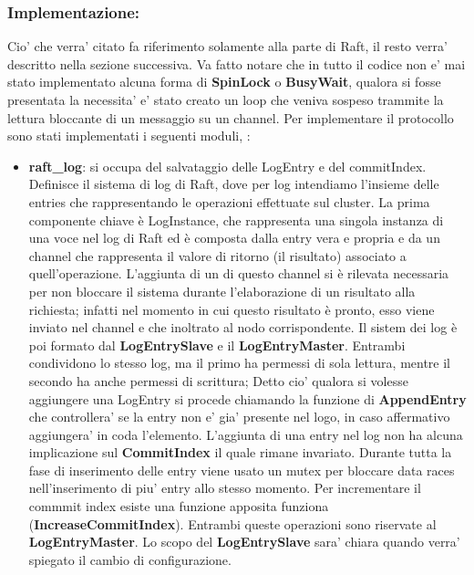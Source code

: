 \subsubsection{Implementazione:\\}
Cio' che verra' citato
fa riferimento solamente alla parte di Raft, il resto verra' descritto nella sezione successiva.
Va fatto notare che in tutto il codice non e' mai stato implementato alcuna forma di 
\textbf{SpinLock} o \textbf{BusyWait}, qualora si fosse presentata la necessita' e' stato
creato un loop che veniva sospeso trammite la lettura bloccante di un messaggio su un channel.
Per implementare il protocollo sono stati implementati i seguenti moduli, :
\begin{itemize}
    \item \textbf{raft\_log}: si occupa del salvataggio delle LogEntry e del commitIndex.
    Definisce il sistema di log di Raft, dove per log intendiamo l'insieme delle entries 
    che rappresentando le operazioni effettuate sul cluster. La prima componente chiave è 
    LogInstance, che 
    rappresenta una singola instanza di una voce nel log di Raft ed è composta dalla entry vera 
    e propria e da un channel che rappresenta il valore di ritorno (il risultato) associato a 
    quell'operazione. L'aggiunta di un 
    di questo channel si è rilevata necessaria per non bloccare il sistema durante l'elaborazione 
    di un risultato alla richiesta; infatti nel momento in cui questo risultato è pronto, esso 
    viene inviato nel channel e che inoltrato al nodo corrispondente.
    Il sistem dei log è poi formato dal \textbf{LogEntrySlave} e il \textbf{LogEntryMaster}. 
    Entrambi condividono 
    lo stesso log, ma il primo ha permessi di sola lettura, mentre il secondo ha anche permessi 
    di scrittura; 
    Detto cio' qualora si volesse aggiungere una LogEntry si procede chiamando la funzione
    di \textbf{AppendEntry} che controllera' se la entry non e' gia' presente nel logo, in 
    caso affermativo aggiungera' in coda l'elemento. L'aggiunta di una entry nel log non ha alcuna
    implicazione sul \textbf{CommitIndex} il quale rimane invariato. Durante 
    tutta la fase di inserimento delle entry viene usato un mutex per bloccare data races
    nell'inserimento di piu' entry allo stesso momento.
    Per incrementare il commmit index esiste una funzione apposita funziona 
    (\textbf{IncreaseCommitIndex}).
    Entrambi queste operazioni sono riservate al \textbf{LogEntryMaster}.
    Lo scopo del \textbf{LogEntrySlave} sara' chiara quando verra' spiegato il 
    cambio di configurazione.


\end{itemize}
